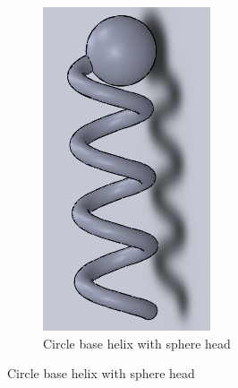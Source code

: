 \documentclass[12pt,a4paper,titlepage]{report}
\begin{document}
 
\begin{figure}
        \centering

  \begin{subfigure}[b]{0.25\textwidth}
                \includegraphics[width=\textwidth]{Design6}
                \caption{Circle base helix with sphere head}
                \label{Design6}

\end{subfigure}
\end{figure}
\end{document}
